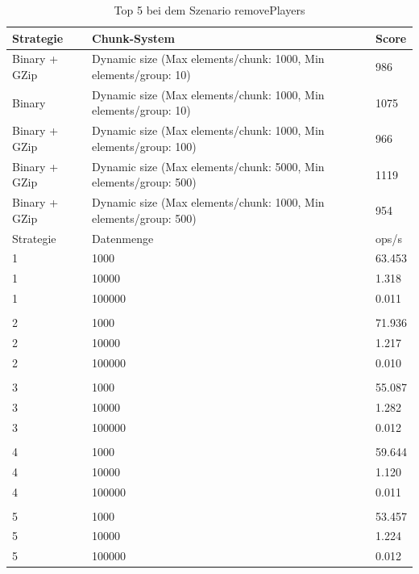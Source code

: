 \begin{table}[htp]
    \centering
    \caption{Top 5 bei dem Szenario removePlayers}
    \begin{tabular}{|l|l|l|}
    \hline
        Strategie & Chunk-System & Score \\
        \hline
        Binary + GZip & Dynamic size (Max elements/chunk: 1000, Min elements/group: 10) & 986\\
        Binary & Dynamic size (Max elements/chunk: 1000, Min elements/group: 10) & 1075\\
        Binary + GZip & Dynamic size (Max elements/chunk: 1000, Min elements/group: 100) & 966\\
        Binary + GZip & Dynamic size (Max elements/chunk: 5000, Min elements/group: 500) & 1119\\
        Binary + GZip & Dynamic size (Max elements/chunk: 1000, Min elements/group: 500) & 954\\
        \hline
        Strategie & Datenmenge & ops/s \\
        \hline
        1 & 1000 & 63.453\\
        1 & 10000 & 1.318\\
        1 & 100000 & 0.011\\
        & & \\
        2 & 1000 & 71.936\\
        2 & 10000 & 1.217\\
        2 & 100000 & 0.010\\
        & & \\
        3 & 1000 & 55.087\\
        3 & 10000 & 1.282\\
        3 & 100000 & 0.012\\
        & & \\
        4 & 1000 & 59.644\\
        4 & 10000 & 1.120\\
        4 & 100000 & 0.011\\
        & & \\
        5 & 1000 & 53.457\\
        5 & 10000 & 1.224\\
        5 & 100000 & 0.012\\
        \hline
    \end{tabular}
    \label{tbl:removePlayers}
\end{table}


